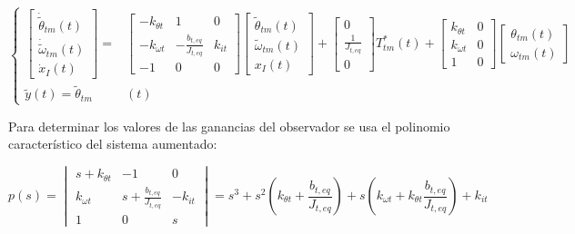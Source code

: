 \[
\left\{
\begin{aligned}
    \begin{bmatrix}
        \dot{\tilde{\theta}}_{tm}(t) \\
        \dot{\tilde{\omega}}_{tm}(t) \\
        \dot{x}_I(t)
    \end{bmatrix}
    =&
    \begin{bmatrix}
        -k_{\theta t} & 1 & 0 \\
        -k_{\omega t} & -\frac{b_{t,eq}}{J_{t,eq}} & k_{it} \\
        -1 & 0 & 0
    \end{bmatrix}
    \begin{bmatrix}
        \tilde{\theta}_{tm}(t) \\
        \tilde{\omega}_{tm}(t) \\
        x_I(t)
    \end{bmatrix}
    +
    \begin{bmatrix}
        0 \\
        \frac{1}{J_{t,eq}} \\
        0
    \end{bmatrix}
    T_{tm}^\ast(t)
    +
    \begin{bmatrix}
        k_{\theta t} & 0 \\
        k_{\omega t} & 0 \\
        1 & 0
    \end{bmatrix}
    \begin{bmatrix}
        \theta_{tm}(t) \\
        \omega_{tm}(t)
    \end{bmatrix}
    \\
    \tilde{y}(t) = \tilde{\theta}_{tm}&(t)
\end{aligned}
\right.
\]

Para determinar los valores de las ganancias del observador se usa el polinomio característico del sistema aumentado:

\[
p(s) = 
\begin{vmatrix}
s + k_{\theta t} & -1 & 0 \\
k_{\omega t} & s + \frac{b_{t,eq}}{J_{t,eq}} & -k_{it} \\
1 & 0 & s
\end{vmatrix}
= s^3 + s^2 ( k_{\theta t}+\frac{b_{t,eq}}{J_{t,eq}}) + s( k_{\omega t}+k_{\theta t}\frac{b_{t,eq}}{J_{t,eq}}) + k_{it}
\]

